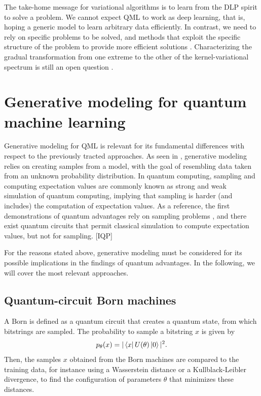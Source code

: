 \documentclass[]{report}
\begin{document}
The take-home message for variational algorithms is to learn from the DLP spirit to solve a problem. We cannot expect QML to work as deep learning, that is, hoping a generic model to learn arbitrary data efficiently. In contrast, we need to rely on specific problems to be solved, and methods that exploit the specific structure of the problem to provide more efficient solutions \cite{aaronson2022how}. Characterizing the gradual transformation from one extreme to the other of the kernel-variational spectrum is still an open question \cite{gil-fuster2024relation}.

\section{Generative modeling for quantum machine learning}

Generative modeling for QML is relevant for its fundamental differences with respect to the previously tracted approaches. As seen in , generative modeling relies on creating samples from a model, with the goal of resembling data taken from an unknown probability distribution. In quantum computing, sampling and computing expectation values are commonly known as strong and weak simulation of quantum computing, implying that sampling is harder (and includes) the computation of expectation values. As a reference, the first demonstrations of quantum advantages rely on sampling problems \cite{arute2019quantum, zhong2020quantum}, and there exist quantum circuits that permit classical simulation to compute expectation values, but not for sampling. [IQP] 

For the reasons stated above, generative modeling must be considered for its possible implications in the findings of quantum advantages. In the following, we will cover the most relevant approaches. 

\subsection{Quantum-circuit Born machines}

A Born is defined as a quantum circuit that creates a quantum state, from which bitstrings are sampled. The probability to sample a bitstring $x$ is given by
\begin{equation}
p_\theta(x) = \vert \bra{x} U(\theta) \ket 0 \vert^2.
\end{equation}
Then, the samples $x$ obtained from the Born machines are compared to the training data, for instance using a Wasserstein distance or a Kullblack-Leibler divergence, to find the configuration of parameters $\theta$ that minimizes these distances. 
\end{document}
